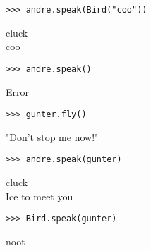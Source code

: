 \newpage
\begin{blocksection}
\vspace{9\baselineskip}
\begin{lstlisting}
>>> andre.speak(Bird("coo"))
\end{lstlisting}
\begin{solution}[.2in]
cluck \\
coo
\end{solution}

\vspace{3\baselineskip}
\begin{lstlisting}
>>> andre.speak()
\end{lstlisting}
\begin{solution}[.2in]
Error
\end{solution}

\vspace{3\baselineskip}
\begin{lstlisting}
>>> gunter.fly()
\end{lstlisting}
\begin{solution}[.2in]
"Don't stop me now!"
\end{solution}

\vspace{3\baselineskip}
\begin{lstlisting}
>>> andre.speak(gunter)
\end{lstlisting}
\begin{solution}[.2in]
cluck \\
Ice to meet you
\end{solution}

\vspace{3\baselineskip}
\begin{lstlisting}
>>> Bird.speak(gunter)
\end{lstlisting}
\begin{solution}[.2in]
noot
\end{solution}

\end{blocksection}
\onecolumn
